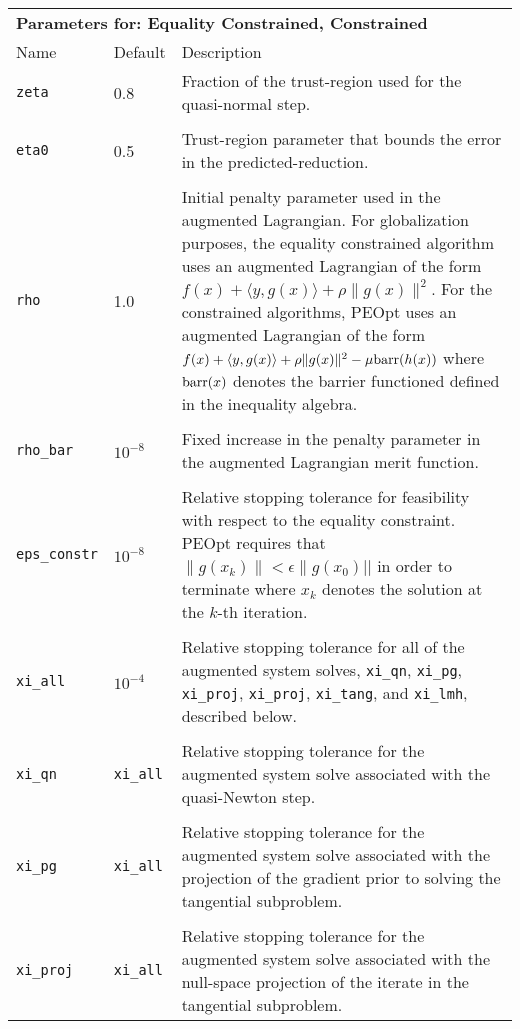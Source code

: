 \documentclass{report}
\begin{document}
\begin{longtable}{llp{}}
\\
\multicolumn{3}{p{\textwidth}}{\bf Parameters for: Equality Constrained, Constrained}\\
Name & Default & Description\\
\texttt{zeta} & 0.8 & Fraction of the trust-region used for the quasi-normal step.\\
\\
\texttt{eta0} & 0.5 & Trust-region parameter that bounds the error in the predicted-reduction.\\
\\
\texttt{rho} & 1.0 & Initial penalty parameter used in the augmented Lagrangian.  For globalization purposes, the equality constrained algorithm uses an augmented Lagrangian of the form $f(x)+\langle y,g(x)\rangle+\rho\|g(x)\|^2$.  For the constrained algorithms, PEOpt uses an augmented Lagrangian of the form $f(x)+\langle y,g(x)\rangle+\rho\|g(x)\|^2-\mu \textnormal{barr}(h(x))$ where $\textnormal{barr}(x)$ denotes the barrier functioned defined in the inequality algebra.\\
\\
\texttt{rho\_bar} & $10^{-8}$ & Fixed increase in the penalty parameter in the augmented Lagrangian merit function.\\
\\
\texttt{eps\_constr} & $10^{-8}$ & Relative stopping tolerance for feasibility with respect to the equality constraint.  PEOpt requires that $\|g(x_k)\|<\epsilon\|g(x_0)||$ in order to terminate where $x_k$ denotes the solution at the $k$-th iteration.\\
\\
\texttt{xi\_all} & $10^{-4}$ & Relative stopping tolerance for all of the augmented system solves, \texttt{xi\_qn}, \texttt{xi\_pg}, \texttt{xi\_proj}, \texttt{xi\_proj}, \texttt{xi\_tang}, and \texttt{xi\_lmh}, described below.\\
\\
\texttt{xi\_qn} & \texttt{xi\_all} & Relative stopping tolerance for the augmented system solve associated with the quasi-Newton step.\\
\\
\texttt{xi\_pg} & \texttt{xi\_all} & Relative stopping tolerance for the augmented system solve associated with the projection of the gradient prior to solving the tangential subproblem.\\
\\
\texttt{xi\_proj} & \texttt{xi\_all} & Relative stopping tolerance for the augmented system solve associated with the null-space projection of the iterate in the tangential subproblem.\\ 

\end{longtable}
\end{document}
